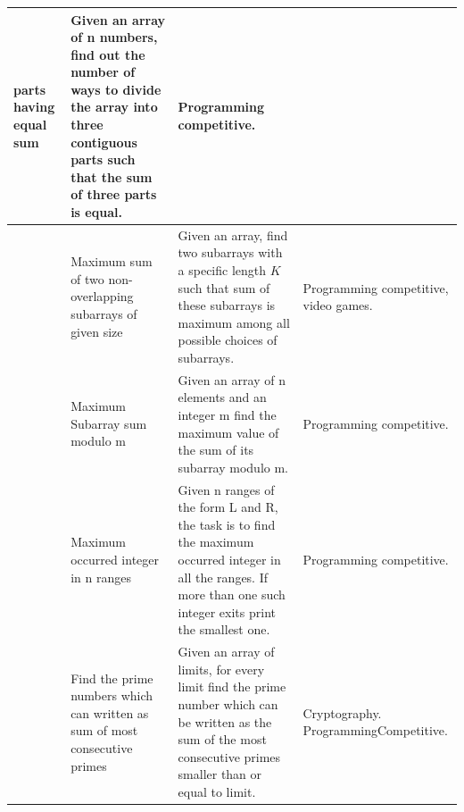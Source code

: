 \documentclass[Ingles]{ic-tese-v1}
\begin{document}
\begin{table}[!t]
\begin{adjustbox}{max width=1.1\textwidth, center}
\begin{tabular}{|>{\centering\arraybackslash}p{0.8cm}|p{5cm}|p{9cm}|p{5cm}|}
			parts having equal sum
			& Given an array of n numbers, find out the number of ways to
			divide the array into three contiguous parts such that the sum
			of three parts is equal.
			& Programming competitive.\\ \hline
			9   & Maximum sum of two non-overlapping subarrays of given size
			& Given an array, find two subarrays with a specific length $K$
			such that sum of these subarrays is maximum among all possible
			choices of subarrays.
			& Programming competitive, video games.\\ \hline
			10 & Maximum Subarray sum modulo m
			& Given an array of n elements and an integer m
			find the maximum value of the sum of its subarray modulo m.
			& Programming competitive.\\ \hline
			11 & Maximum occurred integer in n ranges
			& Given n ranges of the form L and R, the task is to find the
			maximum occurred integer in all the ranges. If more than one
			such integer exits print the smallest one.
			& Programming competitive.\\ \hline
			12 & Find the prime numbers which can written as sum of most
			consecutive primes
			& Given an array of limits, for every limit find the prime number
			which can be written as the sum of the most consecutive primes
			smaller than or equal to limit.
			& Cryptography. Programming\newline  Competitive.\\
			\hline
		\end{tabular}
	\end{adjustbox}
	\label{tab:benchmark}
\end{table}
\end{document}
